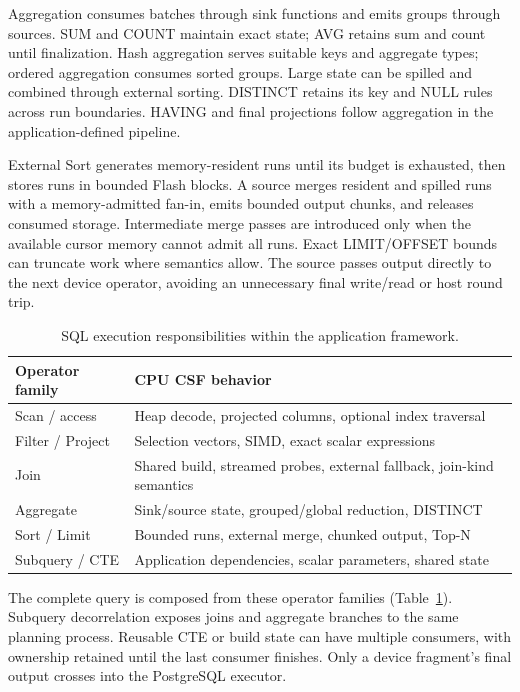 \documentclass[sigconf, nonacm]{acmart}
\begin{document}
Aggregation consumes batches through sink functions and emits groups through
sources. SUM and COUNT maintain exact state; AVG retains sum and count until
finalization. Hash aggregation serves suitable keys and aggregate types;
ordered aggregation consumes sorted groups. Large state can be spilled and
combined through external sorting. DISTINCT retains its key and NULL rules
across run boundaries. HAVING and final projections follow aggregation in
the application-defined pipeline.

External Sort generates memory-resident runs until its budget is exhausted,
then stores runs in bounded Flash blocks. A source merges resident and
spilled runs with a memory-admitted fan-in, emits bounded output chunks,
and releases consumed storage. Intermediate merge passes are introduced only
when the available cursor memory cannot admit all runs. Exact LIMIT/OFFSET
bounds can truncate work where semantics allow. The source passes output
directly to the next device operator, avoiding an unnecessary final
write/read or host round trip.

\begin{table}[t]
\caption{SQL execution responsibilities within the application framework.}
\label{tab:operators}
\small
\begin{tabular}{@{}p{}p{}@{}}
\toprule
Operator family & CPU CSF behavior \\
\midrule
Scan / access & Heap decode, projected columns, optional index traversal \\
Filter / Project & Selection vectors, SIMD, exact scalar expressions \\
Join & Shared build, streamed probes, external fallback, join-kind semantics \\
Aggregate & Sink/source state, grouped/global reduction, DISTINCT \\
Sort / Limit & Bounded runs, external merge, chunked output, Top-N \\
Subquery / CTE & Application dependencies, scalar parameters, shared state \\
\bottomrule
\end{tabular}
\end{table}

The complete query is composed from these operator families
(Table~\ref{tab:operators}). Subquery decorrelation exposes joins and aggregate
branches to the same planning process. Reusable CTE or build state can have
multiple consumers, with ownership retained until the last consumer finishes.
Only a device fragment's final output crosses into the PostgreSQL executor.
\end{document}
